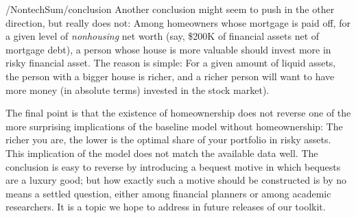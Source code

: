 \documentclass[PortfolioChoiceWithRiskyHousing]{subfiles}
\begin{document}
\begin{verbatimwrite}{\LaTeXOutput/NontechSum/conclusion}
  Another conclusion might seem to push in the other direction, but really does not: Among homeowners whose mortgage is paid off, for a given level of \textit{nonhousing} net worth (say, \$200K of financial assets net of mortgage debt), a person whose house is more valuable should invest more in risky financial asset.  The reason is simple:  For a given amount of liquid assets, the person with a bigger house is richer, and a richer person will want to have more money (in absolute terms) invested in the stock market).

  The final point is that the existence of homeownership does not reverse one of the more surprising implications of the baseline model without homeownership:  The richer you are, the lower is the optimal share of your portfolio in risky assets.  This implication of the model does not match the available data well.  The conclusion is easy to reverse by introducing a bequest motive in which bequests are a luxury good; but how exactly such a motive should be constructed is by no means a settled question, either among financial planners or among academic researchers.  It is a topic we hope to address in future releases of our toolkit.

\end{verbatimwrite}


\clearpage\vfill\eject


\end{document}
